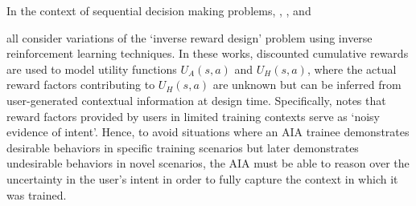 In the context of sequential decision making problems, \citet{Hadfield-Menell2017-tl}, \citet{Hadfield-Menell2016-ws}, and \item \citet{Huang2017-lk} all consider variations of the `inverse reward design' problem using inverse reinforcement learning techniques. In these works, discounted cumulative rewards are used to model utility functions $U_A(s,a)$ and $U_H(s,a)$, where the actual reward factors contributing to $U_H(s,a)$ are unknown but can be inferred from user-generated contextual information at design time. Specifically, \cite{Hadfield-Menell2017-tl} notes that reward factors provided by users in limited training contexts serve as `noisy evidence of intent'. Hence, to avoid situations where an AIA trainee demonstrates desirable behaviors in specific training scenarios but later demonstrates undesirable behaviors in novel scenarios, the AIA must be able to reason over the uncertainty in the user's intent in order to fully capture the context in which it was trained. 
%
